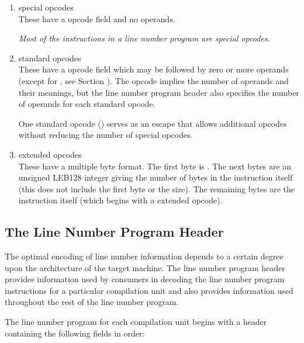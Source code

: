 \begin{enumerate}[1. ]
\item special opcodes \\
These have a \HFTubyte{} opcode field and no operands.\vspace{1ex}

\textit{Most of the instructions in a 
line number program are special opcodes.}

\item standard opcodes \\
These have a \HFTubyte{} opcode field which may be followed by zero or more
 operands (except for 
\mbox{\DWLNSfixedadvancepc,} see 
Section ).
The opcode implies the number of operands and their meanings, but the
line number program header also specifies the number of operands for
each standard opcode.

\bb
One standard opcode (\DWLNSextendedop) serves as an escape that allows
additional opcodes without reducing the number of special opcodes.
\eb

\item extended opcodes \\
These have a multiple byte format. The first byte is 
\bb
\DWLNSextendedop{}.
\eb
The next bytes
are an unsigned LEB128 integer giving the number of bytes in the
instruction itself (this does not include the first 
\bb
\DWLNSextendedop{}
\eb
byte or the size). The
remaining bytes are the instruction itself (which begins with a \HFTubyte{}
extended opcode). \\

\end{enumerate}


\subsection{The Line Number Program Header}
\label{chap:linenumberprogramheader}
The optimal encoding of line number information depends to a
certain degree upon the architecture of the target machine. The
line number program header provides information used by
consumers in decoding the line number program instructions for
a particular compilation unit and also provides information
used throughout the rest of the line number program.

The line number program for each compilation unit begins with
a header containing the following fields in order:

